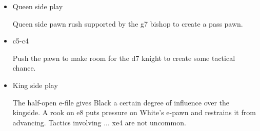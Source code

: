 \begin{itemize}
    \item{Queen side play}

    Queen side pawn rush supported by the g7 bishop to create a pass pawn. 

    \item{c5-c4}

    Push the pawn to make room for the d7 knight to create some tactical chance.
    \item{King side play}

    The half-open e-file gives Black a certain degree of influence over the kingside. A rook on e8 puts pressure on White's e-pawn and restrains it from advancing. Tactics involving ...\symknight{} xe4 are not uncommon.
\end{itemize} 




